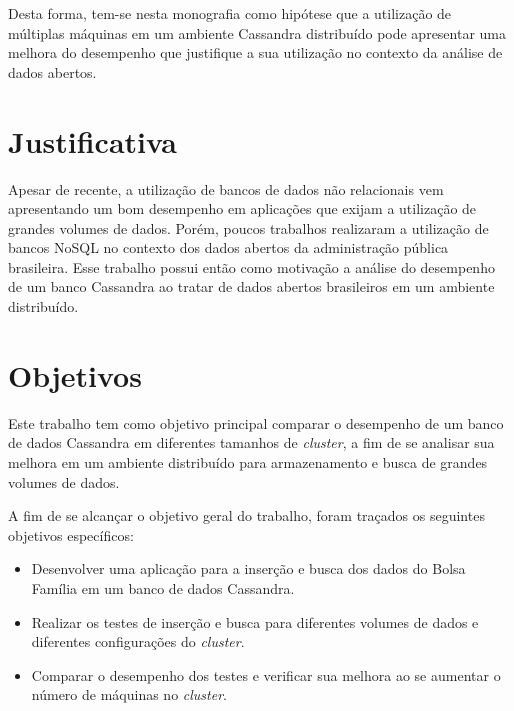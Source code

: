 Desta forma, tem-se nesta monografia como hipótese que a utilização de múltiplas máquinas em um ambiente Cassandra distribuído pode apresentar uma melhora do desempenho que justifique a sua utilização no contexto da análise de dados abertos.

\section{Justificativa}
Apesar de recente, a utilização de bancos de dados não relacionais vem apresentando um bom desempenho em aplicações que exijam a utilização de grandes volumes de dados. Porém, poucos trabalhos realizaram a utilização de bancos NoSQL no contexto dos dados abertos da administração pública brasileira. Esse trabalho possui então como motivação a análise do desempenho de um banco Cassandra ao tratar de dados abertos brasileiros em um ambiente distribuído.

\section{Objetivos}

Este trabalho tem como objetivo principal comparar o desempenho de um banco de dados Cassandra em diferentes tamanhos de \emph{cluster}, a fim de se analisar sua melhora em um ambiente distribuído para armazenamento e busca de grandes volumes de dados.

A fim de se alcançar o objetivo geral do trabalho, foram traçados os seguintes objetivos específicos:
\begin{itemize}
	\item Desenvolver uma aplicação para a inserção e busca dos dados do Bolsa Família em um banco de dados Cassandra.
	
	\item Realizar os testes de inserção e busca para diferentes volumes de dados e diferentes configurações do \emph{cluster}.
	
	\item Comparar o desempenho dos testes e verificar sua melhora ao se aumentar o número de máquinas no \emph{cluster}.
\end{itemize}

